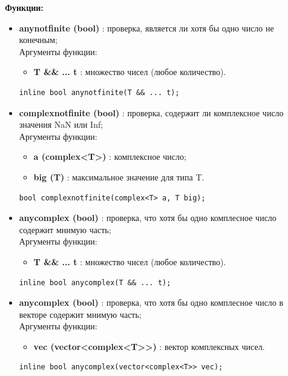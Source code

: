 \documentclass[a4paper,12pt]{article}
\begin{document}
\textbf{Функции:}
\begin{itemize}
    \item \textbf{anynotfinite (bool)} : проверка, является ли хотя бы одно число не конечным;
    \\Аргументы функции:
    \begin{itemize}
        \renewcommand{\labelitemi}{-}
        \item \textbf{T \&\& ... t } : множество чисел (любое количество).
    \end{itemize}
    \begin{lstlisting}[language=С++]
inline bool anynotfinite(T && ... t); \end{lstlisting}

    \item \textbf{complexnotfinite (bool)} : проверка, содержит ли комплексное число значения NaN или Inf;
    \\Аргументы функции:
    \begin{itemize}
        \renewcommand{\labelitemi}{-}
        \item \textbf{a (complex<T>)} : комплексное число;
        \item \textbf{big (T)} : максимальное значение для типа T.
    \end{itemize}
    \begin{lstlisting}[language=С++]
bool complexnotfinite(complex<T> a, T big); \end{lstlisting}

    \item \textbf{anycomplex (bool)} : проверка, что хотя бы одно комплесное число содержит мнимую часть;
    \\Аргументы функции:
    \begin{itemize}
        \renewcommand{\labelitemi}{-}
        \item \textbf{T \&\& ... t } : множество чисел (любое количество).
    \end{itemize}
    \begin{lstlisting}[language=С++]
inline bool anycomplex(T && ... t); \end{lstlisting}

    \item \textbf{anycomplex (bool)} : проверка, что хотя бы одно комплесное число в векторе содержит мнимую часть;
    \\Аргументы функции:
    \begin{itemize}
        \renewcommand{\labelitemi}{-}
        \item \textbf{vec (vector<complex<T>>)} : вектор комплексных чисел.
    \end{itemize}
    \begin{lstlisting}[language=С++]
inline bool anycomplex(vector<complex<T>> vec); \end{lstlisting}


\end{itemize}
\end{document}

